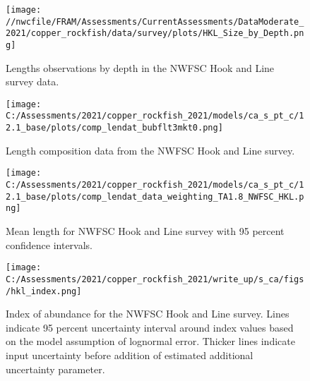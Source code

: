 \documentclass[11pt,
  english,
  a4paper,
]{article}
\begin{document}
\tagmcend\tagstructend


\begin{figure}
\centering
\texttt{[image: //nwcfile/FRAM/Assessments/CurrentAssessments/DataModerate\_2021/copper\_rockfish/data/survey/plots/HKL\_Size\_by\_Depth.png]}
\caption{Lengths observations by depth in the NWFSC Hook and Line survey data.\label{fig:hkl-len-dep}}
\end{figure}

\tagmcend\tagstructend


\begin{figure}
\centering
\texttt{[image: C:/Assessments/2021/copper\_rockfish\_2021/models/ca\_s\_pt\_c/12.1\_base/plots/comp\_lendat\_bubflt3mkt0.png]}
\caption{Length composition data from the NWFSC Hook and Line survey.\label{fig:hkl-len-data}}
\end{figure}

\tagmcend\tagstructend


\begin{figure}
\centering
\texttt{[image: C:/Assessments/2021/copper\_rockfish\_2021/models/ca\_s\_pt\_c/12.1\_base/plots/comp\_lendat\_data\_weighting\_TA1.8\_NWFSC\_HKL.png]}
\caption{Mean length for NWFSC Hook and Line survey with 95 percent confidence intervals.\label{fig:mean-hkl-len-data}}
\end{figure}

\tagmcend\tagstructend


\begin{figure}
\centering
\texttt{[image: C:/Assessments/2021/copper\_rockfish\_2021/write\_up/s\_ca/figs/hkl\_index.png]}
\caption{Index of abundance for the NWFSC Hook and Line survey. Lines indicate 95 percent uncertainty interval around index values based on the model assumption of lognormal error. Thicker lines indicate input uncertainty before addition of estimated additional uncertainty parameter.\label{fig:hkl-index}}
\end{figure}
\end{document}
